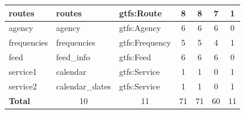 \begin{table}[]
{\begin{tabular}{l|l|l|c|c|c|c}
routes               &  routes         & gtfs:Route                               & 8                     & 8            & 7         & 1      \\ \hline
agency                & agency          & gtfs:Agency                               & 6                     & 6            & 6         & 0      \\ \hline
frequencies       &  frequencies              & gtfs:Frequency                               & 5                     & 5            & 4         & 1      \\ \hline
feed      &  feed\_info               & gtfs:Feed                               & 6                     & 6            & 6         & 0      \\ \hline
service1 &   calendar           & gtfs:Service                               & 1                     & 1            & 0         & 1      \\ \hline
service2 & calendar\_dates       & gtfs:Service                               & 1                     & 1            & 0         & 1      \\ \hline
\textbf{Total}      &  \multicolumn{1}{c|}{10}    & \multicolumn{1}{c|}{11}                           & 71                     & 71            & 60         & 11      \\ \hline
\end{tabular}%
}

\end{table}

